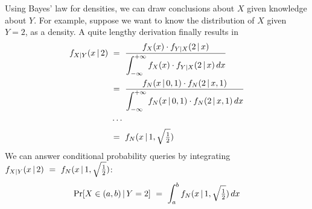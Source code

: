 Using Bayes' law for densities, we can draw conclusions about $X$ given knowledge about $Y$.
For example, suppose we want to know the distribution of $X$ given $Y = 2$, as a density.
A quite lengthy derivation finally results in
\begin{equation}
\begin{aligned}
	f_{X|Y}(x \given 2)&\ =\ \frac{f_{X}(x) \cdot f_{Y|X}(2 \given x)}{\displaystyle\int_{-\infty}^{+\infty} f_{X}(x) \cdot f_{Y|X}(2 \given x)\,dx}
\\
	&\ =\ \frac{f_N(x \given 0,1) \cdot f_N(2 \given x,1)}{\displaystyle\int_{-\infty}^{+\infty}
	f_N(x \given 0,1) \cdot f_N(2 \given x,1)\,dx}
\\
	&\,\,\cdots\ 
\\
	&\ =\ f_N(x \given 1, \sqrt{\tfrac{1}{2}})
\end{aligned}
\end{equation}
We can answer conditional probability queries by integrating $f_{X|Y}(x \,|\, 2)\ =\ f_N(x \,|\, 1, \sqrt{\tfrac{1}{2}})$:
\begin{equation}
	\mathrm{Pr}\!\left[{X \in (a,b) \,|\, Y = 2}\right]\ =\ \int_a^b f_N(x \,|\, 1, \sqrt{\tfrac{1}{2}})\,dx
\end{equation}

